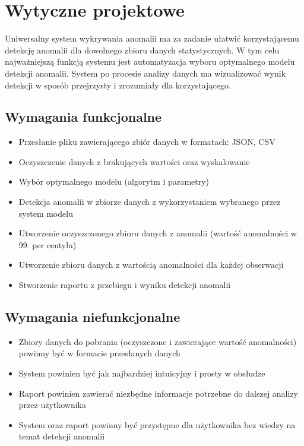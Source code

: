 \section{Wytyczne projektowe}
 Uniwersalny system wykrywania anomalii ma za zadanie ułatwić korzystającemu detekcję anomalii dla dowolnego zbioru danych statystycznych. W tym celu najważniejszą funkcją systemu jest automatyzacja wyboru optymalnego modelu detekcji anomalii. System po procesie analizy danych ma wizualizować wynik detekcji w sposób przejrzysty i zrozumiały dla korzystającego.    
\subsection{Wymagania funkcjonalne}
\begin{itemize}
    \item Przesłanie pliku zawierającego zbiór danych w formatach: JSON, CSV
    \item Oczyszczenie danych z brakujących wartości oraz wyskalowanie 
    \item Wybór optymalnego modelu (algorytm i parametry) 
    \item Detekcja anomalii w zbiorze danych z wykorzystaniem wybranego przez system modelu
    \item Utworzenie oczyszczonego zbioru danych z anomalii (wartość anomalności w 99. per centylu)
    \item Utworzenie zbioru danych z wartością anomalności dla każdej obserwacji
    \item Stworzenie raportu z przebiegu i wyniku detekcji anomalii
\end{itemize}
\subsection{Wymagania niefunkcjonalne}
\begin{itemize}
    \item Zbiory danych do pobrania (oczyszczone i zawierające wartość anomalności) powinny być w formacie przesłanych danych
    \item System powinien być jak najbardziej intuicyjny i prosty w obsłudze
    \item Raport powinien zawierać niezbędne informacje potrzebne do dalszej analizy przez użytkownika
    \item System oraz raport powinny być przystępne dla użytkownika bez wiedzy na temat detekcji anomalii
\end{itemize}
